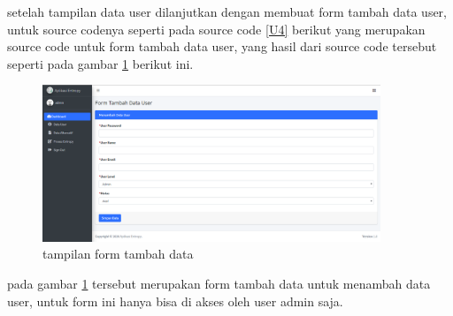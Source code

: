 
	setelah tampilan data user dilanjutkan dengan membuat form tambah data user, untuk source codenya seperti pada source code \ref{U4} berikut yang merupakan source code untuk form tambah data user, yang hasil dari source code tersebut seperti pada gambar \ref{ve14} berikut ini.
\pagebreak
\begin{figure}[!htbp]
	\centerline{\includegraphics[width=0.90\textwidth]{figures/us/add.png}}
	\caption{tampilan form tambah data}
	\label{ve14}
\end{figure}

pada gambar \ref{ve14} tersebut merupakan form tambah data untuk menambah data user, untuk form ini hanya bisa di akses oleh user admin saja.

